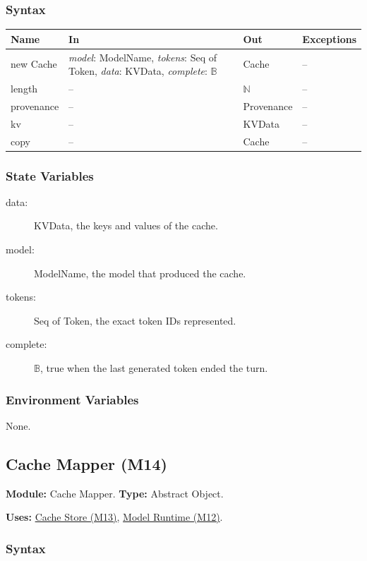 \documentclass[12pt, titlepage]{article}
\begin{document}
\subsubsection*{Syntax}

\begin{tabularx}{\textwidth}{l X l X}
\toprule
\textbf{Name} & \textbf{In} & \textbf{Out} & \textbf{Exceptions}\\
\midrule
new Cache & \emph{model}: ModelName, \emph{tokens}: Seq of Token, \emph{data}: KVData, \emph{complete}: $\mathbb{B}$ & Cache & --\\
length & -- & $\mathbb{N}$ & --\\
provenance & -- & Provenance & --\\
kv & -- & KVData & --\\
copy & -- & Cache & --\\
\bottomrule
\end{tabularx}

\subsubsection*{State Variables}

\begin{description}
\item[data:] KVData, the keys and values of the cache.
\item[model:] ModelName, the model that produced the cache.
\item[tokens:] Seq of Token, the exact token IDs represented.
\item[complete:] $\mathbb{B}$, true when the last generated token ended the turn.
\end{description}

\subsubsection*{Environment Variables}

None.

\newpage
\subsection{Cache Mapper (M14)}\label{mMap}

\textbf{Module:} Cache Mapper. \textbf{Type:} Abstract Object.

\textbf{Uses:} \hyperref[mCache]{Cache Store (M13)}, \hyperref[mModelRun]{Model Runtime (M12)}.

\subsubsection*{Syntax}
\end{document}
